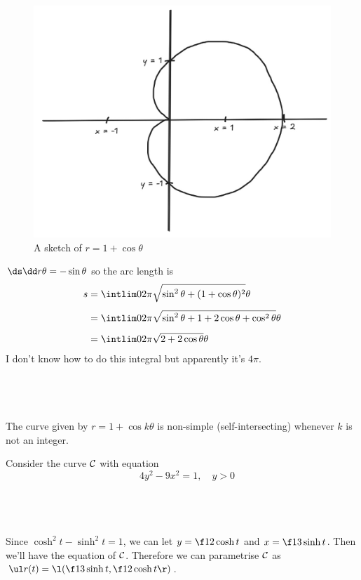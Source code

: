 \documentclass[a4paper]{article}
\begin{document}
\begin{figure}[h]
	\centering
	\includegraphics[scale=0.3]{Q1b}
	\caption{A sketch of $r = 1 + \cos\theta$}
\end{figure}

$\ds\dd r\theta = -\sin\theta$ so the arc length is \begin{align*}
s &= \intlim 0{2\pi} {\sqrt{\sin^2 \theta + (1 + \cos\theta)^2}} \theta\\[1ex]
&= \intlim 0{2\pi} {\sqrt{\sin^2 \theta + 1 + 2\cos\theta + \cos^2 \theta}} \theta\\[1ex]
&= \intlim 0{2\pi} {\sqrt{2 + 2\cos\theta}} \theta
\end{align*}
I don't know how to do this integral but apparently it's $4\pi$.

\subsection{~}

The curve given by $r = 1 + \cos k\theta$ is non-simple (self-intersecting) whenever $k$ is not an integer.


Consider the curve $\cal C$ with equation $$\quad 4y^2 - 9x^2 = 1, \quad y > 0$$

\subsection{~}

Since $\cosh^2 t - \sinh^2 t = 1$, we can let $y = \f12 \cosh t$ and $x = \f13 \sinh t$. Then we'll have the equation of $\cal C$. Therefore we can parametrise $\cal C$ as $\ul r(t) = \l( \f13 \sinh t, \f12 \cosh t \r)$.
\end{document}
